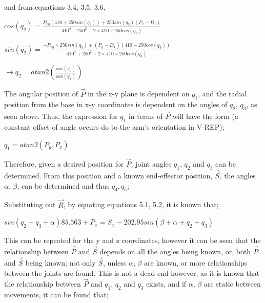 \documentclass[12pt,openany,a4paper]{book}
\begin{document}
and from equations 3.4, 3.5, 3.6,

\vspace{\baselineskip}
\begin{center}
$cos(q_2) = \frac{ P_{xy} (410 + 250 sin (q_3)) + 250 sin(q_3)(P_z - D_1) }{410^2 + 250^2 + 2 \times 410 \times 250 cos(q_3)}$

\vspace{\baselineskip}
$sin(q_2) = \frac{-P_{xy} \times 250 sin(q_3) + (P_y - D_1)(410 + 250 cos(q_3))}{410^2 + 250^2 + 2 \times 410 \times 250 cos(q_3)}$

\vspace{\baselineskip}
$\rightarrow q_2 = atan2( \frac{sin(q_2)}{cos(q_2)})$

\end{center}
\vspace{\baselineskip}

The angular position of $\vec{P}$ in the x-y plane is dependent on $q_1$, and the radial position from the base in x-y coordinates is dependent on the angles of $q_2$, $q_3$, as seen above. Thus, the expression for $q_1$ in terms of $\vec{P}$ will have the form (a constant offset of angle occurs do to the arm's orientation in V-REP);

\vspace{\baselineskip}
\begin{center}
$q_1 = atan2( P_y, P_x)$
\end{center}

\vspace{\baselineskip}
Therefore, given a desired position for $\vec{P}$, joint angles $q_1$, $q_2$ and $q_3$ can be determined. From this position and a known end-effector position, $\vec{S}$, the angles $\alpha$, $\beta$, can be determined and thus $q_4, q_5$;

Substituting out $\vec{R}$, by equating equations 5.1, 5.2, it is known that;

\vspace{\baselineskip}
\begin{center}
$sin(q_2 + q_3 + \alpha) 85.563 + P_x = S_x -202.95 sin(\beta + \alpha + q_2 + q_3) $
\vspace{\baselineskip}
\end{center}

This can be repeated for the y and z coordinates, however it can be seen that the relationship between $\vec{P}$ and $\vec{S}$ depends on all the angles being known, or, both $\vec{P}$ and $\vec{S}$ being known; not only $\vec{S}$, unless $\alpha$, $\beta$ are known, or more relationships between the joints are found. This is not a dead-end however, as it is known that the relationship between $\vec{P}$ and $q_1$, $q_2$ and $q_3$ exists, and if $\alpha$, $\beta$ are static between movements, it can be found that;
\end{document}
